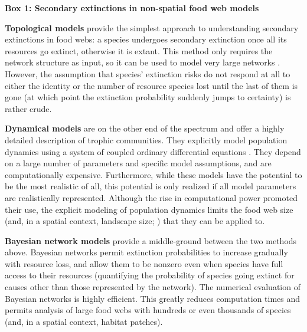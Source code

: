 \documentclass[11pt]{article}
\begin{document}
\begin{mybox}[p]
\begin{mdframed}
\begin{center} \textbf{\large{Box 1: Secondary extinctions in non-spatial food web models}} \end{center}

\small

\bigskip

\noindent \textbf{Topological models} provide the simplest approach to understanding secondary extinctions in food webs: a species undergoes secondary extinction once all its resources go extinct, otherwise it is extant. This method only requires the network structure as input, so it can be used to model very large networks \citep{Dunne2009}. However, the assumption that species' extinction risks do not respond at all to either the identity or the number of resource species lost until the last of them is gone (at which point the extinction probability suddenly jumps to certainty) is rather crude.

\bigskip

\noindent \textbf{Dynamical models} are on the other end of the spectrum and offer a highly detailed description of trophic communities. They explicitly model population dynamics using a system of coupled ordinary differential equations \citep{Berlow2009, Binzer2011, Curtsdotter2011, Riede2011}. They depend on a large number of parameters and specific model assumptions, and are computationally expensive. Furthermore, while these models have the potential to be the most realistic of all, this potential is only realized if all model parameters are realistically represented. Although the rise in computational power promoted their use, the explicit modeling of population dynamics limits the food web size (and, in a spatial context, landscape size; \citealp{Ryser2019}) that they can be applied to.

\bigskip

\noindent \textbf{Bayesian network models} \citep{Eklofetal2013MEE} provide a middle-ground between the two methods above. Bayesian networks permit extinction probabilities to increase gradually with resource loss, and allow them to be nonzero even when species have full access to their resources (quantifying the probability of species going extinct for causes other than those represented by the network). The numerical evaluation of Bayesian networks is highly efficient. This greatly reduces computation times and permits analysis of large food webs with hundreds or even thousands of species (and, in a spatial context, habitat patches).


\end{mdframed}
\end{mybox}
\end{document}
